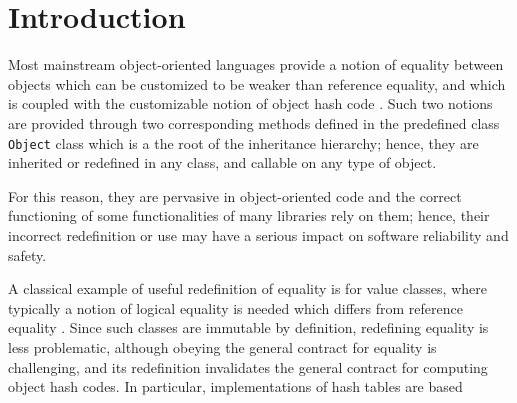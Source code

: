\section{Introduction}

Most mainstream object-oriented languages provide a notion of equality between objects which can be customized to be weaker than
reference equality, and which is coupled with the customizable notion of object hash code \cite{Bloch18}. Such two notions are provided
through two corresponding methods defined in the predefined class \lstinline{Object} class which is a the root of the inheritance hierarchy; hence,
they are inherited or redefined in any class, and callable on any type of object.

For this reason, they are pervasive in object-oriented code and the correct functioning of some functionalities of many libraries rely on them;
hence, their incorrect redefinition or use may have a serious impact on software reliability and safety.

A classical example of useful redefinition of equality is for value classes, where typically a notion of logical equality is needed which differs
from reference equality \cite{Bloch18}. Since such classes are immutable by definition, redefining equality is less problematic, although
obeying the general contract for equality is challenging, and its redefinition invalidates the general contract for computing object hash codes. 
In particular, implementations of hash tables are based 
